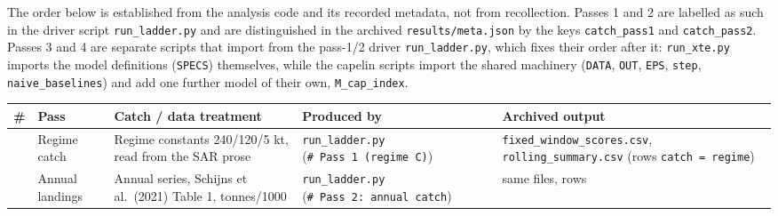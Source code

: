 \documentclass[11pt]{article}
\begin{document}
The order below is established from the analysis code and its recorded
metadata, not from recollection. Passes 1 and 2 are labelled as such in
the driver script \texttt{run\_ladder.py} and are distinguished in the
archived \texttt{results/meta.json} by the keys \texttt{catch\_pass1}
and \texttt{catch\_pass2}. Passes 3 and 4 are separate scripts that
import from the pass-1/2 driver \texttt{run\_ladder.py}, which fixes
their order after it: \texttt{run\_xte.py} imports the model definitions
(\texttt{SPECS}) themselves, while the capelin scripts import the shared
machinery (\texttt{DATA}, \texttt{OUT}, \texttt{EPS}, \texttt{step},
\texttt{naive\_baselines}) and add one further model of their own,
\texttt{M\_cap\_index}.

{\def\LTcaptype{none} %
\begin{longtable}[]{@{}
  >{\raggedright\arraybackslash}p{}
  >{\raggedright\arraybackslash}p{}
  >{\raggedright\arraybackslash}p{}
  >{\raggedright\arraybackslash}p{}
  >{\raggedright\arraybackslash}p{}@{}}
\toprule\noalign{}
\begin{minipage}[b]{\linewidth}\raggedright
\#
\end{minipage} & \begin{minipage}[b]{\linewidth}\raggedright
Pass
\end{minipage} & \begin{minipage}[b]{\linewidth}\raggedright
Catch / data treatment
\end{minipage} & \begin{minipage}[b]{\linewidth}\raggedright
Produced by
\end{minipage} & \begin{minipage}[b]{\linewidth}\raggedright
Archived output
\end{minipage} \\
\midrule\noalign{}
\endhead
\bottomrule\noalign{}
\endlastfoot
1 & Regime catch & Regime constants 240/120/5 kt, read from the SAR
prose & \texttt{run\_ladder.py} (\texttt{\#\ Pass\ 1\ (regime\ C)}) &
\texttt{fixed\_window\_scores.csv}, \texttt{rolling\_summary.csv} (rows
\texttt{catch\ =\ regime}) \\
2 & Annual landings & Annual series, Schijns et al.~(2021) Table 1,
tonnes/1000 & \texttt{run\_ladder.py}
(\texttt{\#\ Pass\ 2:\ annual\ catch}) & same files, rows

\end{longtable}}
\end{document}
